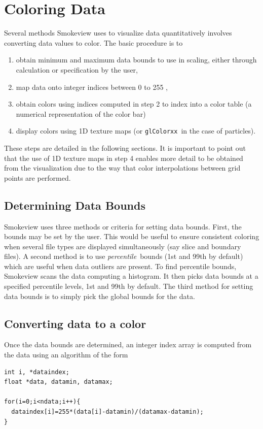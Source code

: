 \documentclass[11pt,twoside]{book}
\begin{document}
%
%

\chapter{Coloring Data}
Several methods Smokeview uses to visualize data quantitatively involves converting data values to color.
The basic procedure is to
\begin{enumerate}
\item obtain minimum and maximum data bounds to use in scaling, either through calculation or specification by the user,
\item map data onto integer indices between 0 to 255 ,
\item obtain colors using indices computed in step 2 to index into a color table (a numerical representation of the color bar)
\item display colors using 1D texture maps (or {\tt glColorxx}\ in the case of particles).
\end{enumerate}
These steps are detailed in the following sections.   It is important to point out that the use of 1D texture maps in step 4 enables more detail to be obtained from the visualization due to the way that color interpolations between grid points are performed.

\section{Determining Data Bounds}Smokeview uses three methods or criteria for setting data bounds.  First, the bounds may be set by the user.  This would be useful to ensure consistent coloring when several file types are displayed simultaneously (say slice and boundary files).  A second method is to use {\em percentile}\ bounds (1st and 99th by default) which are useful when data outliers are present.  To find percentile bounds, Smokeview scans the data computing a histogram.  It then picks data bounds at a specified percentile levels, 1st and 99th by default.  The third method for setting data bounds is to simply pick the global bounds for the data.

\section{Converting data to a color}
Once the data bounds are determined, an integer index array is computed from the data using an algorithm of the form
\begin{verbatim}
int i, *dataindex;
float *data, datamin, datamax;

for(i=0;i<ndata;i++){
  dataindex[i]=255*(data[i]-datamin)/(datamax-datamin);
}
\end{verbatim}
\end{document}
